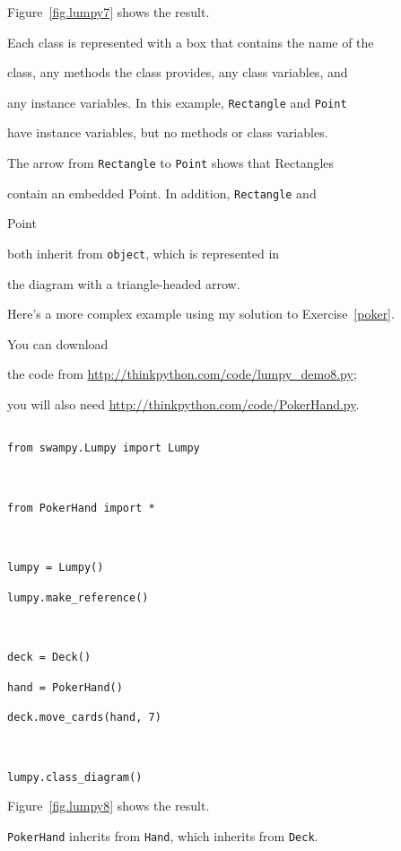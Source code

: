 Figure~\ref{fig.lumpy7} shows the result.  

Each class is represented with a box that contains the name of the

class, any methods the class provides, any class variables, and

any instance variables.  In this example, {\tt Rectangle} and {\tt Point}

have instance variables, but no methods or class variables.



The arrow from {\tt Rectangle} to {\tt Point} shows that Rectangles

contain an embedded Point.  In addition, {\tt Rectangle} and {\tt

  Point} both inherit from {\tt object}, which is represented in

the diagram with a triangle-headed arrow.




Here's a more complex example using my solution to Exercise~\ref{poker}.

You can download

the code from \url{http://thinkpython.com/code/lumpy_demo8.py};

you will also need \url{http://thinkpython.com/code/PokerHand.py}.



\begin{verbatim}

from swampy.Lumpy import Lumpy



from PokerHand import *



lumpy = Lumpy()

lumpy.make_reference()



deck = Deck()

hand = PokerHand()

deck.move_cards(hand, 7)



lumpy.class_diagram()

\end{verbatim}



Figure~\ref{fig.lumpy8} shows the result.  

{\tt PokerHand} inherits from {\tt Hand}, which inherits from {\tt Deck}.

